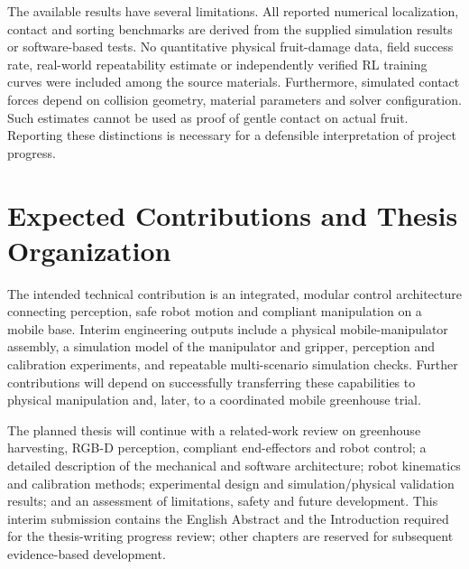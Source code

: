 The available results have several limitations. All reported numerical localization,
contact and sorting benchmarks are derived from the supplied simulation results or
software-based tests. No quantitative physical fruit-damage data, field success rate,
real-world repeatability estimate or independently verified RL training curves were
included among the source materials. Furthermore, simulated contact forces depend on
collision geometry, material parameters and solver configuration. Such estimates cannot
be used as proof of gentle contact on actual fruit. Reporting these distinctions is
necessary for a defensible interpretation of project progress.

\section{Expected Contributions and Thesis Organization}
\label{sec:contributions}

The intended technical contribution is an integrated, modular control architecture
connecting perception, safe robot motion and compliant manipulation on a mobile base.
Interim engineering outputs include a physical mobile-manipulator assembly, a simulation
model of the manipulator and gripper, perception and calibration experiments, and
repeatable multi-scenario simulation checks. Further contributions will depend on
successfully transferring these capabilities to physical manipulation and, later, to
a coordinated mobile greenhouse trial.

The planned thesis will continue with a related-work review on greenhouse harvesting,
RGB-D perception, compliant end-effectors and robot control; a detailed description of
the mechanical and software architecture; robot kinematics and calibration methods;
experimental design and simulation/physical validation results; and an assessment of
limitations, safety and future development. This interim submission contains the
English Abstract and the Introduction required for the thesis-writing progress review;
other chapters are reserved for subsequent evidence-based development.

